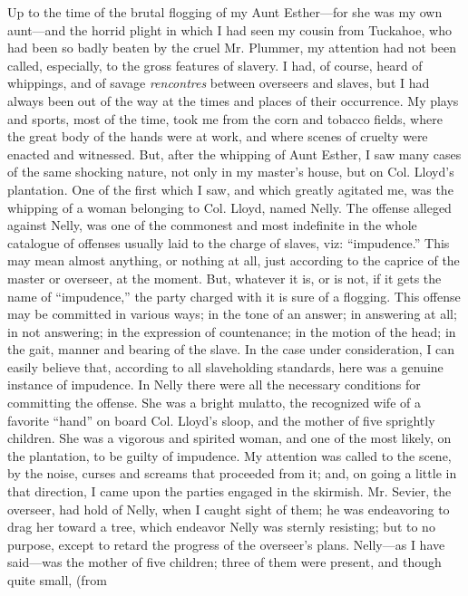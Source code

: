 Up to the time of the brutal flogging of my Aunt Esther---for she was my
own aunt---and the horrid plight in which I had seen my cousin from
Tuckahoe, who had been so badly beaten by the cruel Mr. Plummer, my
attention had not been called, especially, to the gross features of
slavery. I had, of course, heard of whippings, and of savage
\emph{rencontres} between overseers and slaves, but I had always been
out of the way at the times and places of their occurrence. My plays and
sports, most of the time, took me from the corn and tobacco fields,
where the great body of the hands were at work, and where scenes of
cruelty were {\protect\hypertarget{92}{}{}}enacted and witnessed. But,
after the whipping of Aunt Esther, I saw many cases of the same shocking
nature, not only in my master's house, but on Col. Lloyd's plantation.
One of the first which I saw, and which greatly agitated me, was the
whipping of a woman belonging to Col. Lloyd, named Nelly. The offense
alleged against Nelly, was one of the commonest and most indefinite in
the whole catalogue of offenses usually laid to the charge of slaves,
viz: ``impudence.'' This may mean almost anything, or nothing at all,
just according to the caprice of the master or overseer, at the moment.
But, whatever it is, or is not, if it gets the name of ``impudence,''
the party charged with it is sure of a flogging. This offense may be
committed in various ways; in the tone of an answer; in answering at
all; in not answering; in the expression of countenance; in the motion
of the head; in the gait, manner and bearing of the slave. In the case
under consideration, I can easily believe that, according to all
slaveholding standards, here was a genuine instance of impudence. In
Nelly there were all the necessary conditions for committing the
offense. She was a bright mulatto, the recognized wife of a favorite
``hand'' on board Col. Lloyd's sloop, and the mother of five sprightly
children. She was a vigorous and spirited woman, and one of the most
likely, on the plantation, to be guilty of impudence. My attention was
called to the scene, by the noise, curses and screams that proceeded
from it; and, on going a little in that direction, I came upon the
parties engaged in the skirmish. Mr. Sevier, the overseer, had hold of
Nelly, when I caught sight of them; he {\protect\hypertarget{93}{}{}}was
endeavoring to drag her toward a tree, which endeavor Nelly was sternly
resisting; but to no purpose, except to retard the progress of the
overseer's plans. Nelly---as I have said---was the mother of five
children; three of them were present, and though quite small, (from
